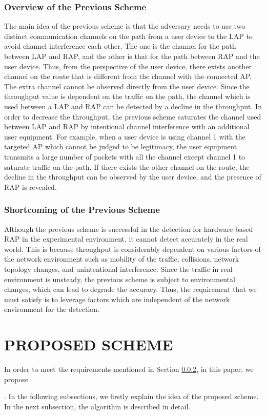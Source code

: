 \documentclass[conference]{IEEEtran}
\begin{document}
\subsubsection{Overview of the Previous Scheme}
The main idea of the previous scheme \cite{previous} is that the adversary needs to use two distinct communication channels on the path from a user device to the LAP to avoid channel interference each other.
The one is the channel for the path between LAP and RAP, and the other is that for the path between RAP and the user device.
Thus, from the perspective of the user device, there exists another channel on the route that is different from the channel with the connected AP.
The extra channel cannot be observed directly from the user device.
Since the throughput value is dependent on the traffic on the path, the channel which is used between a LAP and RAP can be detected by a decline in the throughput.
In order to decrease the throughput, the previous scheme saturates the channel used between LAP and RAP by intentional channel interference with an additional user equipment.
For example, when a user device is using channel 1 with the targeted AP which cannot be judged to be legitimacy, the user equipment transmits a large number of packets with all the channel except channel 1 to saturate traffic on the path.
If there exists the other channel on the route, the decline in the throughput can be observed by the user device, and the presence of RAP is revealed.

\subsubsection{Shortcoming of the Previous Scheme}\label{sec:shortcoming}
Although the previous scheme is successful in the detection for hardware-based RAP in the experimental environment, it cannot detect accurately in the real world.
This is because throughput is considerably dependent on various factors of the network environment such as mobility of the traffic, collisions, network topology changes, and unintentional interference.
Since the traffic in real environment is unsteady, the previous scheme is subject to environmental changes, which can lead to degrade the accuracy.
Thus, the requirement that we must satisfy is to leverage factors which are independent of the network environment for the detection.

\section{PROPOSED SCHEME}
In order to meet the requirements mentioned in Section \ref{sec:shortcoming}, in this paper, we propose \title{}.
In the following subsections, we firstly explain the idea of the proposed scheme.
In the next subsection, the algorithm is described in detail.
\end{document}
